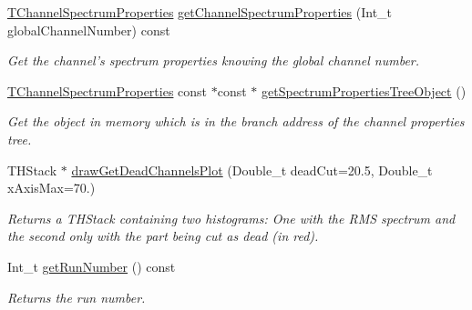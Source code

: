 \begin{DoxyCompactItemize}
\hyperlink{class_t_channel_spectrum_properties}{TChannelSpectrumProperties} \hyperlink{class_spectrum_properties_run_info_aa3a3a6c0169bffdc12b9940cd085344c}{getChannelSpectrumProperties} (Int\_\-t globalChannelNumber) const 
\begin{DoxyCompactList}\small\item\em Get the channel's spectrum properties knowing the global channel number. \item\end{DoxyCompactList}\item 
\hyperlink{class_t_channel_spectrum_properties}{TChannelSpectrumProperties} const $\ast$const $\ast$ \hyperlink{class_spectrum_properties_run_info_a13a12de80cf8fce594345616da473856}{getSpectrumPropertiesTreeObject} ()
\begin{DoxyCompactList}\small\item\em Get the object in memory which is in the branch address of the channel properties tree. \item\end{DoxyCompactList}\item 
THStack $\ast$ \hyperlink{class_spectrum_properties_run_info_a4cce9dcb12a35b4c43d6e6efdd906b01}{drawGetDeadChannelsPlot} (Double\_\-t deadCut=20.5, Double\_\-t xAxisMax=70.)
\begin{DoxyCompactList}\small\item\em Returns a THStack containing two histograms: One with the RMS spectrum and the second only with the part being cut as dead (in red). \item\end{DoxyCompactList}\item 
Int\_\-t \hyperlink{class_spectrum_properties_run_info_a54c0276d0cfdda159644c833ef35a492}{getRunNumber} () const 
\begin{DoxyCompactList}\small\item\em Returns the run number. \item\end{DoxyCompactList}\end{DoxyCompactItemize}
